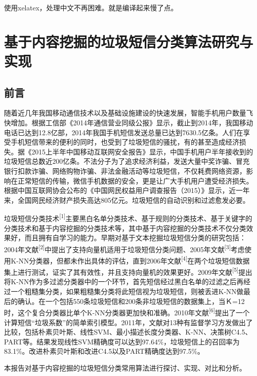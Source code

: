 \documentclass{article}
\begin{document}
使用xelatex，处理中文不再困难。就是编译起来慢了点。
\section{基于内容挖掘的垃圾短信分类算法研究与实现}\label{ux57faux4e8eux5185ux5bb9ux6316ux6398ux7684ux5783ux573eux77edux4fe1ux5206ux7c7bux7b97ux6cd5ux7814ux7a76ux4e0eux5b9eux73b0}

\subsection{前言}\label{ux524dux8a00}

随着近几年我国移动通信技术以及基础设施建设的快速发展，智能手机用户数量飞快增加。根据工信部《2014年通信营业同级公报》显示，截止到2014年，我国移动电话已达到12.8亿部，2014年我国手机短信发送总量已达到7630.5亿条。人们在享受手机短信带来的便利的同时，也受到了垃圾短信的骚扰，有的甚至造成经济损失。据《2015上半年中国移动互联网安全报告》显示，中国手机用户半年接收到的垃圾短信总数近200亿条。不法分子为了追求经济利益，发送大量中奖诈骗、冒充银行扣款诈骗、网络购物诈骗、非法金融活动等垃圾短信，不仅耗费网络资源，影响在正常短信的传输，微信手机数据的安全，更是让广大手机用户遭受经济损失。根据中国互联网协会公布的《中国网民权益用户调查报告（2015）》显示，近一年来，全国网民经济财产损失高达805亿元。垃圾短信的自动识别和过滤愈发必要。

垃圾短信分类技术\textsuperscript{{[}1{]}}主要黑白名单分类技术、基于规则的分类技术、基于关键字的分类技术和基于内容挖掘的分类技术等，其中基于内容挖掘的分类技术不仅分类效果好，而且拥有自学习的能力。早期对基于文本挖掘垃圾短信分类的研究包括：2004年文献\textsuperscript{{[}2{]}}中提出了支持向量机适用于垃圾短信分类问题、2005年文献\textsuperscript{{[}3{]}}考虑使用K-NN分类器，但都未作出具体的评估，直到2006年文献\textsuperscript{{[}4{]}}在两个垃圾短信数据集上进行测试，证实了其有效性，并且支持向量机的效果更好。2009年文献\textsuperscript{{[}5{]}}提出将K-NN作为多过滤分类器中的一个环节，首先短信经过黑白名单的过滤之后再经过一个粗糙集分类，如果粗糙集分类将此短信视为垃圾短信，则被丢进K-NN做最后的确认。在一个包括550条垃圾短信和200条非垃圾短信的数据集上，当Ｋ=12时，这个复合分类器比单个K-NN分类器更加快和准确。2010年文献\textsuperscript{{[}6{]}}提出了一个计算短信``垃圾系数''的简单索引模型。2011年，文献对13种有监督学习方发做出了比较，包括朴素贝叶斯、线性SVM、最小描述长度分类器、K-NN、决策树C4.5、PART等。结果发现线性SVM精确度可以达到97.64\%，垃圾短信上的召回率为83.1\%。改进朴素贝叶斯和改进C4.5以及PART精确度达到97.5\%。

本报告对基于内容挖掘的垃圾短信分类常用算法进行探讨、实现、对比和分析。
\end{document}
